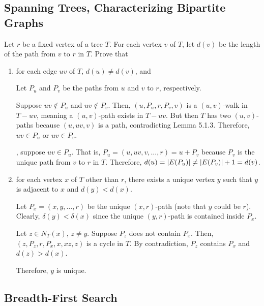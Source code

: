 \documentclass[class=math239,notes,tikz]{agony}
\begin{document}
\subsection{Spanning Trees, Characterizing Bipartite Graphs}

\begin{xca}
  Let $r$ be a fixed vertex of a tree $T$.
  For each vertex $v$ of $T$, let $d(v)$ be
  the length of the path from $v$ to $r$ in $T$. Prove that
\end{xca}
\begin{enumerate}
  \item for each edge $uv$ of $T$, $d(u) \neq d(v)$, and
        \begin{prf}
          Let $P_u$ and $P_v$ be the paths from $u$ and $v$ to $r$, respectively.

          Suppose $uv \not\in P_u$ and $uv \not\in P_v$.
          Then, $(u,P_u,r,P_v,v)$ is a $(u,v)$-walk in $T-uv$,
          meaning a $(u,v)$-path exists in $T-uv$.
          But then $T$ has two $(u,v)$-paths because $(u,uv,v)$ is a path,
          contradicting Lemma 5.1.3.
          Therefore, $uv \in P_u$ or $uv \in P_v$.

          \WLOG, suppose $uv \in P_u$.
          That is, $P_u = (u,uv,v,\dotsc,r) = u + P_v$
          because $P_v$ is the unique path from $v$ to $r$ in $T$.
          Therefore, $d(u) = \abs{E(P_u)} \neq \abs{E(P_v)} + 1 = d(v)$.
        \end{prf}
  \item for each vertex $x$ of $T$ other than $r$,
        there exists a unique vertex $y$
        such that $y$ is adjacent to $x$ and $d(y) < d(x)$.
        \begin{prf}
          Let $P_x = (x,y,\dotsc,r)$ be the unique $(x,r)$-path (note that $y$ could be $r$).
          Clearly, $\delta(y) < \delta(x)$ since the unique $(y,r)$-path
          is contained inside $P_x$.

          Let $z \in N_T(x)$, $z \neq y$.
          Suppose $P_z$ does not contain $P_x$.
          Then, $(z,P_z,r,P_x,x,xz,z)$ is a cycle in $T$.
          By contradiction, $P_z$ contains $P_x$ and $d(z) > d(x)$.

          Therefore, $y$ is unique.
        \end{prf}
\end{enumerate}

\subsection{Breadth-First Search}
\end{document}
